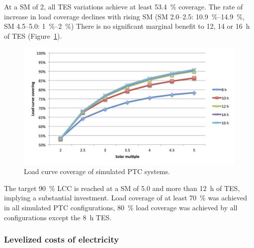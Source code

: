 At a \ac{SM} of \num{2}, all \ac{TES} variations achieve at least \SI{53.4}{\percent} coverage. The rate of increase in load coverage declines with rising \ac{SM} (\ac{SM} \numrange{2.0}{2.5}: \SIrange{10.9}{14.9}{\percent}, \ac{SM} \numrange{4.5}{5.0}: \SIrange{1}{2}{\percent}) There is no significant marginal benefit to \num{12}, \num{14} or \SI{16}{h} of \ac{TES} (Figure~\ref{PTC_LCCF}).

\begin{figure}[bhtp]  
\centering
\includegraphics[width=1\linewidth]{FIG/PTC_LCCF}
\caption[Load curve coverage of simulated PTC systems.]{Load curve coverage of simulated PTC systems.}\label{PTC_LCCF}
\end{figure}


The target \SI{90}{\percent} \ac{LCC} is reached at a \ac{SM} of \num{5.0} and more than \SI{12}{h} of \ac{TES}, implying a substantial investment. Load coverage of at least \SI{70}{\percent} was achieved in all simulated \ac{PTC} configurations,  \SI{80}{\percent} load coverage was achieved by all configurations except the \SI{8}{h} \ac{TES}.
\pagebreak
\subsubsection{Levelized costs of electricity}

